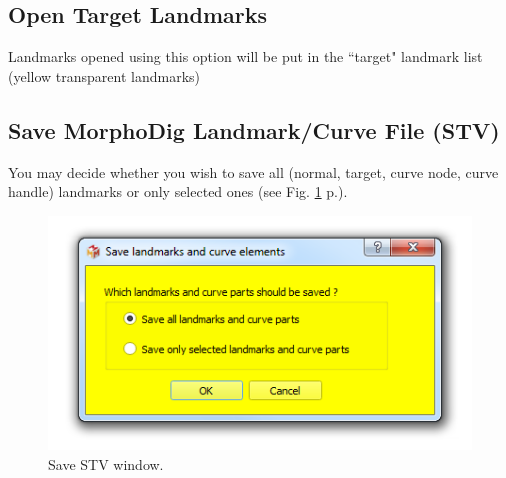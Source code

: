 \subsection{Open Target Landmarks}
Landmarks opened using this option will be put in the ``target" landmark list (yellow transparent landmarks)
\subsection{Save MorphoDig Landmark/Curve File (STV)}
You may decide whether you wish to save all (normal, target, curve node, curve handle) landmarks or only selected ones (see Fig. \ref{save_stv} p.\pageref{save_stv}).
\begin{figure}
  \centering
  \includegraphics[scale=0.5]{images/07/landmarks/save_stv.png}
 \caption{Save STV window.}
\label{save_stv}
\end{figure}

